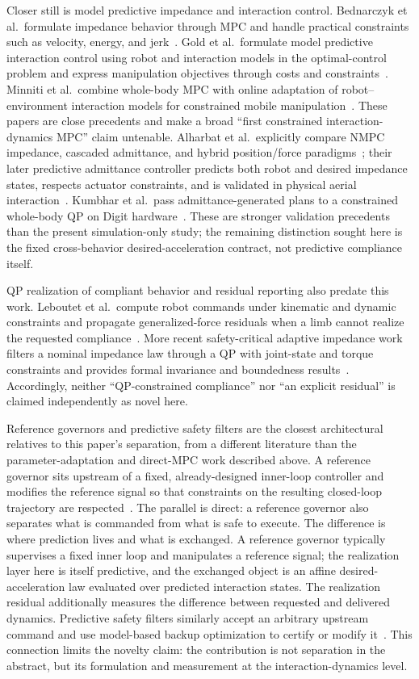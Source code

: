 \documentclass[journal]{IEEEtran}
\begin{document}
Closer still is model predictive impedance and interaction control.
Bednarczyk et al.\ formulate impedance behavior through MPC and handle
practical constraints such as velocity, energy, and jerk~\cite{ref5}.
Gold et al.\ formulate model predictive interaction control using robot
and interaction models in the optimal-control problem and express
manipulation objectives through costs and constraints~\cite{ref6}.
Minniti et al.\ combine whole-body MPC with online adaptation of
robot--environment interaction models for constrained mobile
manipulation~\cite{ref7}. These papers are close precedents and make a
broad ``first constrained interaction-dynamics MPC'' claim untenable.
Alharbat et al.\ explicitly compare NMPC impedance, cascaded admittance,
and hybrid position/force paradigms~\cite{ref14}; their later predictive
admittance controller predicts both robot and desired impedance states,
respects actuator constraints, and is validated in physical aerial
interaction~\cite{ref15}. Kumbhar et al.\ pass admittance-generated plans
to a constrained whole-body QP on Digit hardware~\cite{ref17}. These are
stronger validation precedents than the present simulation-only study;
the remaining distinction sought here is the fixed cross-behavior
desired-acceleration contract, not predictive compliance itself.

QP realization of compliant behavior and residual reporting also predate
this work. Leboutet et al.\ compute robot commands under kinematic and
dynamic constraints and propagate generalized-force residuals when a
limb cannot realize the requested compliance~\cite{ref16}. More recent
safety-critical adaptive impedance work filters a nominal impedance law
through a QP with joint-state and torque constraints and provides formal
invariance and boundedness results~\cite{ref18}. Accordingly, neither
``QP-constrained compliance'' nor ``an explicit residual'' is claimed
independently as novel here.

Reference governors and predictive safety filters are the closest
architectural relatives to this paper's separation, from a different literature than the
parameter-adaptation and direct-MPC work described above. A reference
governor sits upstream of a fixed, already-designed inner-loop controller
and modifies the reference signal so that constraints on the resulting
closed-loop trajectory are respected~\cite{ref8}. The parallel is direct:
a reference governor also separates what is commanded from what is safe
to execute. The difference is where prediction lives and what is
exchanged. A reference governor typically supervises a fixed inner loop
and manipulates a reference signal; the realization layer here is itself
predictive, and the exchanged object is an affine desired-acceleration
law evaluated over predicted interaction states. The realization residual
additionally measures the difference between requested and delivered
dynamics. Predictive safety filters similarly accept an arbitrary
upstream command and use model-based backup optimization to certify or
modify it~\cite{ref13}. This connection limits the novelty claim: the contribution is
not separation in the abstract, but its formulation and measurement at
the interaction-dynamics level.
\end{document}

